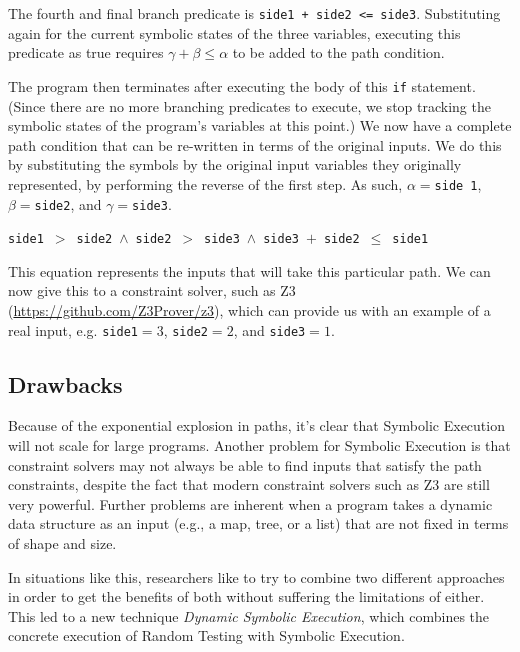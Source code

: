 The fourth and final branch predicate is {\tt side1 + side2 <= side3}.
Substituting again for the current symbolic states of the three variables, 
executing this predicate as true requires $\gamma + \beta \leq \alpha$ to be
added to the path condition. 

The program then terminates after executing the body of this {\tt if} statement.
(Since there are no more branching predicates to execute, we stop tracking the
symbolic states of the program's variables at this point.) We now have a
complete path condition that can be re-written in terms of the original inputs.
We do this by substituting the symbols by the original input variables they
originally represented, by performing the reverse of the first step. As
such, $\alpha = ${\tt side 1}, $\beta = ${\tt side2}, and $\gamma = ${\tt side3}.

\begin{center}
{\tt side1}~$ > $~{\tt side2}~$ \wedge $~{\tt side2}~$ > $~{\tt side3}~$ \wedge
$~{\tt side3}~$ + $~{\tt side2}~$ \leq $~{\tt side1}
\end{center}

This equation represents the inputs that will take this particular path. We can
now give this to a constraint solver, such as Z3
(\url{https://github.com/Z3Prover/z3}), which can provide us with an example of
a real input, e.g. {\tt side1}$ = 3$, {\tt side2}$ = 2$, and {\tt side3}$ = 1$. 

\subsection{Drawbacks}

Because of the exponential explosion in paths, it's clear that Symbolic
Execution will not scale for large programs. Another problem for Symbolic
Execution is that constraint solvers may not always be able to find inputs that
satisfy the path constraints, despite the fact that modern constraint solvers
such as Z3 are still very powerful. Further problems are inherent when a program
takes a dynamic data structure as an input (e.g., a map, tree, or a list) that
are not fixed in terms of shape and size. 

In situations like this, researchers like to try to combine two different
approaches in order to get the benefits of both without suffering the
limitations of either. This led to a new technique {\it Dynamic Symbolic
Execution}, which combines the concrete execution of Random Testing with
Symbolic Execution.

